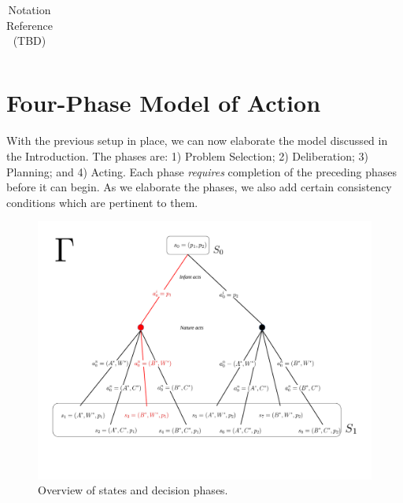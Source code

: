 \documentclass[
11pt,
titlepage,
reqno,
]{article}%
\theoremstyle{definition}
\begin{document}
\begin{table}
\begin{tabular}{@{}rll@{}}
\bottomrule
\end{tabular}
\caption{Notation Reference (TBD)}\label{Tab: Notation}
\end{table}




\section{Four-Phase Model of Action}

With the previous setup in place, we can now elaborate the model discussed in the Introduction.
The phases are: 1) Problem Selection; 2) Deliberation; 3) Planning; and 4) Acting.
Each phase \textit{requires} completion of the preceding phases before it can begin.
As we elaborate the phases, we also add certain consistency conditions which are pertinent to them.

\begin{figure}[h!]
	\centering
	\includegraphics*[page=4,trim = 0in 3in 0in 0in,scale=.65]{Awareness_Diagrams_All}
	\caption{Overview of states and decision phases.\label{Diag: p-04}}%
\end{figure}
\end{document}
